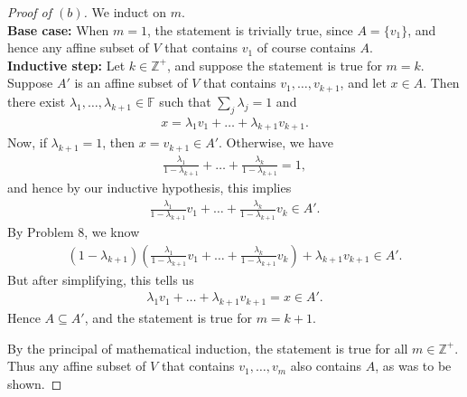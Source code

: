 \documentclass{extarticle}
\newcommand{\Z}{\mathbb{Z}}
\newcommand{\F}{\mathbb{F}}
\begin{document}
\begin{proof}[Proof of $(b)$]
We induct on $m$.\\
\textbf{Base case:} When $m = 1$, the statement is trivially true, since $A = \{v_1\}$, and hence any affine subset of $V$ that contains $v_1$ of course contains $A$.\\
\textbf{Inductive step:} Let $k\in\Z^+$, and suppose the statement is true for $m = k$.  Suppose $A'$ is an affine subset of $V$ that contains $v_1,\dots, v_{k + 1}$, and let $x\in A$.  Then there exist $\lambda_1,\dots, \lambda_{k + 1}\in\F$ such that $\sum_{j}\lambda_j = 1$ and
\begin{align*}
x = \lambda_1v_1 + \dots + \lambda_{k+1}v_{k+1}.
\end{align*}
Now, if $\lambda_{k + 1} = 1$, then $x = v_{k + 1}\in A'$.  Otherwise, we have
\begin{align*}
\frac{\lambda_1}{1 - \lambda_{k + 1}} + \dots + \frac{\lambda_{k}}{1-\lambda_{k + 1}} = 1,
\end{align*}
and hence by our inductive hypothesis, this implies
\begin{align*}
\frac{\lambda_1}{1 - \lambda_{k + 1}}v_1 + \dots + \frac{\lambda_{k}}{1-\lambda_{k + 1}}v_k \in A'.
\end{align*}
By Problem 8, we know
\begin{align*}
(1 - \lambda_{k + 1})\left(\frac{\lambda_1}{1 - \lambda_{k + 1}}v_1 + \dots + \frac{\lambda_{k}}{1-\lambda_{k + 1}}v_k\right) + \lambda_{k + 1}v_{k + 1}\in A'.
\end{align*}
But after simplifying, this tells us
\begin{align*}
\lambda_1v_1 + \dots + \lambda_{k+1}v_{k+1} = x \in A'.
\end{align*}
Hence $A\subseteq A'$, and the statement is true for $m = k + 1$.
\par By the principal of mathematical induction, the statement is true for all $m\in\Z^+$.  Thus any affine subset of $V$ that contains $v_1,\dots, v_m$ also contains $A$, as was to be shown.
\end{proof}
\end{document}
